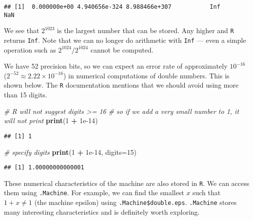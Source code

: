 \documentclass[]{article}
\newenvironment{Shaded}{\begin{snugshade}}{\end{snugshade}}
\newcommand{\CommentTok}[1]{\textcolor[rgb]{0.56,0.35,0.01}{\textit{#1}}}
\newcommand{\DataTypeTok}[1]{\textcolor[rgb]{0.13,0.29,0.53}{#1}}
\newcommand{\DecValTok}[1]{\textcolor[rgb]{0.00,0.00,0.81}{#1}}
\newcommand{\FloatTok}[1]{\textcolor[rgb]{0.00,0.00,0.81}{#1}}
\newcommand{\KeywordTok}[1]{\textcolor[rgb]{0.13,0.29,0.53}{\textbf{#1}}}
\newcommand{\NormalTok}[1]{#1}
\newcommand{\OperatorTok}[1]{\textcolor[rgb]{0.81,0.36,0.00}{\textbf{#1}}}
\newcommand{\StringTok}[1]{\textcolor[rgb]{0.31,0.60,0.02}{#1}}
\begin{document}
\begin{verbatim}
## [1]  0.000000e+00 4.940656e-324 8.988466e+307           Inf           NaN
\end{verbatim}

We see that \(2^{1023}\) is the largest number that can be stored. Any
higher and \texttt{R} returns \texttt{Inf}. Note that we can no longer
do arithmetic with \texttt{Inf} --- even a simple operation such as
\(2^{1024}/2^{1024}\) cannot be computed.

We have 52 precision bits, so we can expect an error rate of
approximately \(10^{-16}\) (\(2^{-52} \approx 2.22 \times 10^{-16}\)) in
numerical computations of double numbers. This is shown below. The
\texttt{R} documentation mentions that we should avoid using more than
15 digits.

\begin{Shaded}
\begin{Highlighting}[]
\CommentTok{# R will not suggest digits >= 16}
\CommentTok{# so if we add a very small number to 1, it will not print}
\KeywordTok{print}\NormalTok{(}\DecValTok{1} \OperatorTok{+}\StringTok{ }\FloatTok{1e-14}\NormalTok{)}
\end{Highlighting}
\end{Shaded}

\begin{verbatim}
## [1] 1
\end{verbatim}

\begin{Shaded}
\begin{Highlighting}[]
\CommentTok{# specify digits}
\KeywordTok{print}\NormalTok{(}\DecValTok{1} \OperatorTok{+}\StringTok{ }\FloatTok{1e-14}\NormalTok{, }\DataTypeTok{digits=}\DecValTok{15}\NormalTok{)}
\end{Highlighting}
\end{Shaded}

\begin{verbatim}
## [1] 1.00000000000001
\end{verbatim}

These numerical characteristics of the machine are also stored in
\texttt{R}. We can access them using \texttt{.Machine}. For example, we
can find the smallest \(x\) such that \(1 + x \neq 1\) (the machine
epsilon) using \texttt{.Machine\$double.eps}. \texttt{.Machine} stores
many interesting characteristics and is definitely worth exploring.

\begin{Shaded}
\end{Shaded}
\end{document}
